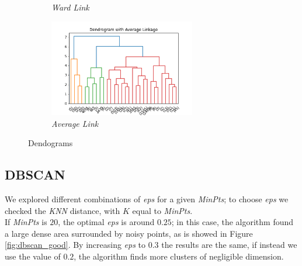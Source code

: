 \begin{figure}[h!]
\begin{subfigure}{0.49\textwidth}
        \caption{\emph{Ward Link}}
        \label{fig:ward_link}
    \end{subfigure}
    \begin{subfigure}{0.49\textwidth}
         \centering
         \includegraphics[width=0.7\textwidth]{img/clustering/avg_link.png}
         \caption{\emph{Average Link}}
         \label{fig:avg_link}
     \end{subfigure}
     \caption{Dendograms}
    \label{fig:dendograms}
\end{figure}

\newpage

\subsection{DBSCAN}

We explored different combinations of \emph{eps} for a given \emph{MinPts}; to choose \emph{eps} we checked the \emph{KNN} distance, with $K$ equal to \emph{MinPts}.\\
If \emph{MinPts} is $20$, the optimal \emph{eps} is around $0.25$; in this case, the algorithm found a large dense area surrounded by noisy points, as is showed in Figure \ref{fig:dbscan_good}. By increasing \emph{eps} to $0.3$ the results are the same, if instead we use the value of $0.2$, the algorithm finds more clusters of negligible dimension.

